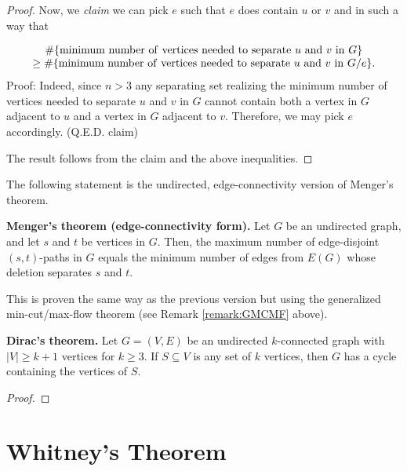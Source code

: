 \begin{proof}
Now, we {\it claim} we can pick $e$ such that $e$ does contain $u$ or $v$
and in such a way that

\[
\begin{array}{c}
\# \{{\rm minimum\ number \ of\ vertices\ needed\ to\ separate\ }u\
{\rm and\  }v\ {\rm in\ }G\}\\
\geq
\# \{{\rm minimum\ number \ of\ vertices\ needed\ to\ separate\ }u\
{\rm and\  }v\ {\rm in}\ G/e\}.
\end{array}
\]
Proof: Indeed, since $n>3$ any separating set realizing
the minimum number  of vertices needed to separate $u$ and
$v$ in $G$ cannot contain both a vertex in $G$ adjacent to $u$ and a vertex in
$G$ adjacent to $v$. Therefore, we may pick $e$ accordingly.
(Q.E.D. claim)

The result follows from the claim and the above inequalities.
\end{proof}

The following statement
is the undirected, edge-connectivity version of
Menger's theorem.

\begin{theorem}
\textbf{Menger's theorem (edge-connectivity form).}
{\rm
Let $G$ be an undirected graph, and let $s$ and $t$ be vertices in
$G$.
Then, the maximum number of edge-disjoint $(s,t)$-paths in
$G$
equals the minimum number of edges from $E(G)$ whose
deletion separates $s$ and $t$.
}
\end{theorem}

This is proven the same way as the previous version
but using the generalized min-cut/max-flow theorem (see
Remark \ref{remark:GMCMF} above).

\begin{theorem}
\textbf{Dirac's theorem.}
Let $G = (V,E)$ be an undirected $k$-connected graph with
$|V| \geq k + 1$ vertices for $k \geq 3$. If $S \subseteq V$ is any
set of $k$ vertices, then $G$ has a cycle containing the vertices of
$S$.
\end{theorem}

\begin{proof}
\end{proof}



\section{Whitney's Theorem}

